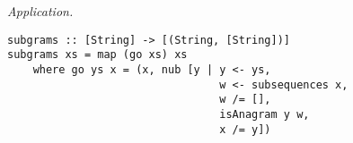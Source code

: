\begin{parts}
\begin{subparts}
        \begin{solution}
            \emph{Application.}
            \begin{verbatim}
subgrams :: [String] -> [(String, [String])]
subgrams xs = map (go xs) xs 
    where go ys x = (x, nub [y | y <- ys, 
                                 w <- subsequences x, 
                                 w /= [], 
                                 isAnagram y w, 
                                 x /= y])
            \end{verbatim}
        \end{solution}
        
    \end{subparts}

\end{parts}

